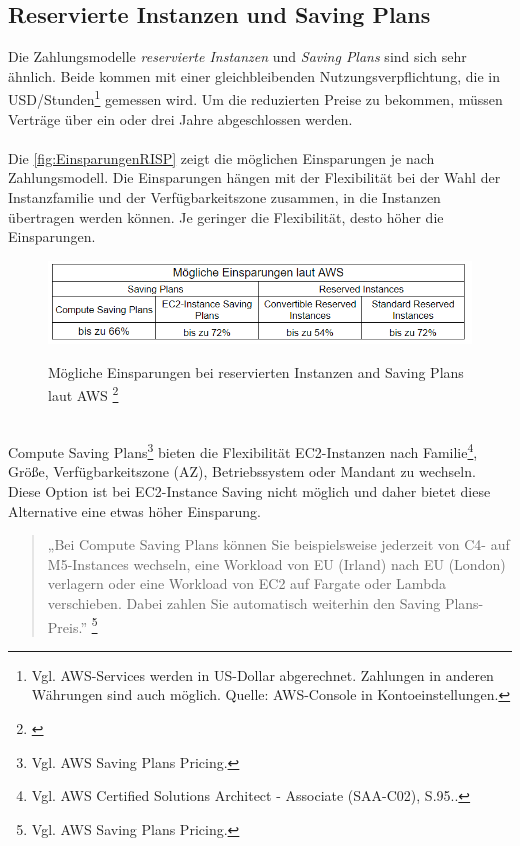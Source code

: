 \subsection{Reservierte Instanzen und Saving Plans}
Die Zahlungsmodelle \textit{reservierte Instanzen} und \textit{Saving Plans} sind sich sehr ähnlich. Beide kommen mit einer gleichbleibenden  Nutzungsverpflichtung, die in USD/Stunden\footnote{Vgl. AWS-Services werden in US-Dollar abgerechnet. Zahlungen in anderen Währungen sind auch möglich. Quelle: AWS-Console in Kontoeinstellungen.} gemessen wird. Um die reduzierten Preise  zu bekommen, müssen Verträge über ein oder drei Jahre abgeschlossen werden. 
\\\\
Die \autoref{fig:EinsparungenRISP} zeigt die möglichen Einsparungen je nach Zahlungsmodell. Die Einsparungen hängen mit der Flexibilität bei der Wahl der Instanzfamilie und der Verfügbarkeitszone zusammen, in die Instanzen übertragen werden können. Je geringer die Flexibilität, desto höher die Einsparungen.
\begin{figure}[h!]
  \centering
  \includegraphics[scale=0.8]{sources/EinsparungenRISP}\label{fig:EinsparungenRISP}\\
  \caption[Mögliche Einsparungen bei reservierten Instanzen and Saving Plans laut AWS]{}
  \label{fig:EinsparungenRISP}
  Mögliche Einsparungen bei reservierten Instanzen and Saving Plans laut AWS
  \footnote{\cite{AMZ07,AMZ11}}
\end{figure}
\\
Compute Saving Plans\footnote{Vgl. AWS Saving Plans Pricing\cite{AMZ11}.} bieten die Flexibilität EC2-Instanzen nach Familie\footnote{Vgl. AWS Certified Solutions Architect - Associate (SAA-C02), S.95.\cite{AWS1}.}, Größe, Verfügbarkeitszone (AZ), Betriebssystem oder Mandant zu wechseln. Diese Option ist bei EC2-Instance Saving nicht möglich und daher bietet diese Alternative eine etwas höher Einsparung.
\begin{quote}
    „Bei Compute Saving Plans können Sie beispielsweise jederzeit von C4- auf M5-Instances wechseln, eine Workload von EU (Irland) nach EU (London) verlagern oder eine Workload von EC2 auf Fargate oder Lambda verschieben. Dabei zahlen Sie automatisch weiterhin den Saving Plans-Preis.”
    \footnote{Vgl. AWS Saving Plans Pricing\cite{AMZ11}.}
\end{quote}
